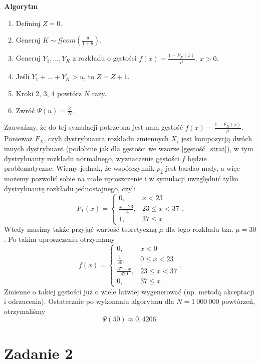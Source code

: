 \documentclass[12pt]{mwart}
\begin{document}
	\noindent \textbf{Algorytm}
	\begin{enumerate}[leftmargin=10mm]
		\item Definiuj $Z = 0$.
		\item Generuj $K \sim \mathcal{G}eom \left( \frac{\theta}{1+\theta} \right)$.
		\item Generuj $Y_1, \dots, Y_K$ z rozkładu o gęstości $f(x) = \frac{1 - F_X(x)}{\mu}, \ x > 0$.
		\item Jeśli $Y_1 + \dots + Y_K > u$, to $Z = Z + 1$.
		\item Kroki 2, 3, 4 powtórz $N$ razy.
		\item Zwróć $\Psi(u) = \frac{Z}{N}$.
	\end{enumerate}
	Zauważmy, że do tej symulacji potrzebna jest nam gęstość $f(x) = \frac{1 - F_X(x)}{\mu}$. Ponieważ $F_X$, czyli dystrybuanta rozkładu zmiennych $X_i$ jest kompozycją dwóch innych dystrybuant (podobnie jak dla gęstości we wzorze \eqref{gęstość_strat}), w tym dystrybuanty rozkładu normalnego, wyznaczenie gęstości $f$ będzie problematyczne. Wiemy jednak, że współczynnik $p_2$ jest bardzo mały, a więc możemy pozwolić sobie na małe uproszczenie i w symulacji uwzględnić tylko dystrybuantę rozkładu jednostajnego, czyli
	$$ F_1(x) = \begin{cases}
		0, & x < 23 \\
		\frac{x - 23}{14}, & 23 \leq x < 37 \\
		1, & 37 \leq x
	\end{cases}. $$
	Wtedy musimy także przyjąć wartość teoretyczną $\mu$ dla tego rozkładu tzn. $\mu = 30$. Po takim uproszczeniu otrzymamy 
	$$ f(x) = \begin{cases}
		0, & x < 0 \\
		\frac{1}{30}, & 0 \leq x < 23 \\
		\frac{37 - x}{420}, & 23 \leq x < 37\\
		0, & 37 \leq x
		\end{cases}. $$
	Zmienne o takiej gęstości już o wiele łatwiej wygenerować (np. metodą akceptacji i odrzucenia). Ostatecznie po wykonaniu algorytmu dla $N = 1\ 000\ 000$ powtórzeń, otrzymaliśmy
	$$ \Psi(50) \approx 0,4206.$$
	
	
	\section{Zadanie 2}
\end{document}
